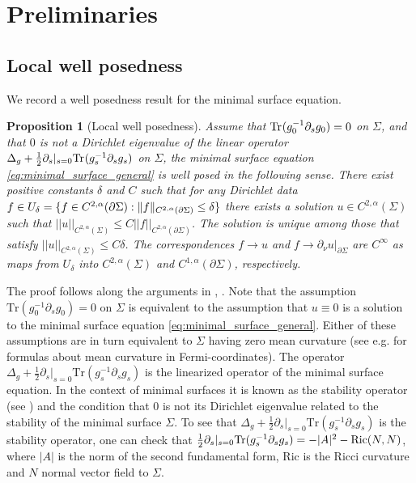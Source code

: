 \documentclass[12pt]{amsart}
\def\p{\partial}
\DeclarePairedDelimiter\norm{\lVert}{\rVert}
\newtheorem{proposition}[theorem]{Proposition}
\theoremstyle{definition}
\theoremstyle{remark}
\newcommand{\abs}[1]{\lvert #1 \rvert}
\newcommand{\s}{\hspace{0.5pt}}
\begin{document}
\section{Preliminaries}\label{Section 2}
\subsection{Local well posedness}
We record a well posedness result for the minimal surface equation.
\begin{proposition}[Local well posedness]\label{prop:local_well_posedness}
 Assume that $\text{Tr}\s (g_0^{-1}\p_sg_0)=0$ on $\Sigma$, and that $0$ is not a Dirichlet eigenvalue of the linear operator $\Delta_g+\frac{1}{2}\p_s|_{s=0} \text{Tr}\s (g_s^{-1}\p_sg_s)$ on $\Sigma$, the minimal surface equation \eqref{eq:minimal_surface_general} is well posed in the following sense. 
There exist positive constants $\delta$ and $C$ such that for any Dirichlet data $f\in U_\delta=\{f\in  C^{2,\alpha}(\partial\Sigma): \norm{f}_{C^{2,\alpha}(\p \Sigma)}\leq \delta\}$ there exists a solution $u\in C^{2,\alpha}(\Sigma)$ such that $||u||_{C^{2,\alpha}(\Sigma)}\leq C||f||_{C^{2,\alpha}(\p\Sigma)}$. The solution is unique among those  that satisfy $||u||_{C^{2,\alpha}(\Sigma)}\leq C\delta$. The correspondences $f\to u$ and $f\to\partial_\nu u|_{\p\Sigma}$ are $C^\infty$ as maps from $U_\delta$ into $C^{2,\alpha}(\Sigma)$ and $C^{1,\alpha}(\p\Sigma)$, respectively.
\end{proposition}

The proof follows along the arguments in \cite[Section 2]{LLLS2019inverse}, \cite[Appendix B]{CFKKU}. Note that the assumption $\text{Tr}(g_0^{-1}\p_sg_0)=0$ on $\Sigma$ is equivalent to the assumption that $u\equiv 0$ is a solution to the minimal surface equation \eqref{eq:minimal_surface_general}. Either of these assumptions are in turn equivalent to $\Sigma$ having zero mean curvature (see e.g. \cite[Section 2]{lassas2016calder} for formulas about mean curvature in Fermi-coordinates). The operator $\Delta_g+\frac{1}{2}\p_s|_{s=0} \text{Tr}(g_s^{-1}\p_sg_s)$ is the linearized operator of the minimal surface equation. In the context of minimal surfaces it is known as the stability operator (see \cite[Section 8]{colding2011course}) and the condition that $0$ is not its Dirichlet eigenvalue related to the stability of the minimal surface $\Sigma$. To see that $\Delta_g+\frac{1}{2}\p_s|_{s=0} \text{Tr}(g_s^{-1}\p_sg_s)$ is the stability operator, one can check that $\frac{1}{2}\p_s|_{s=0} \text{Tr}(g_s^{-1}\p_sg_s)=-\abs{A}^2-\text{\text{Ric}}(N,N)$, where $\abs{A}$ is the norm of the second fundamental form, $\text{Ric}$ is the Ricci curvature and $N$ normal vector field to $\Sigma$.
\end{document}
